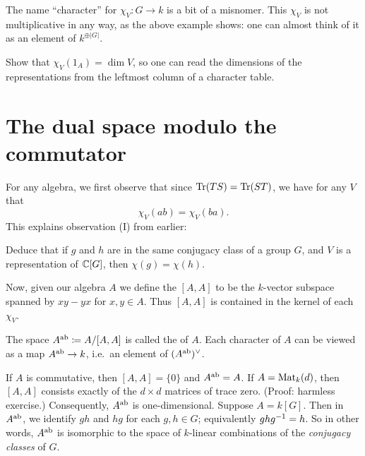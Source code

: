 \begin{abuse}
	The name ``character'' for $\chi_V \colon G \to k$ is a bit of a misnomer.
	This $\chi_V$ is not multiplicative in any way,
	as the above example shows: one can almost think of it as
	an element of $k^{\oplus |G|}$.
\end{abuse}

\begin{ques}
	Show that $\chi_V(1_A) = \dim V$,
	so one can read the dimensions of the representations
	from the leftmost column of a character table.
\end{ques}

\section{The dual space modulo the commutator}
For any algebra, we first observe that since $\operatorname{Tr}(TS) = \operatorname{Tr}(ST)$,
we have for any $V$ that
\[ \chi_V(ab) = \chi_V(ba). \]
This explains observation (I) from earlier:
\begin{ques}
	Deduce that if $g$ and $h$ are in the same conjugacy class of a
	group $G$, and $V$ is a representation of $\mathbb C[G]$,
	then $\chi(g) = \chi(h)$.
\end{ques}
Now, given our algebra $A$ we define the  $[A,A]$
to be the $k$-vector subspace spanned by $xy-yx$ for $x,y \in A$.
Thus $[A,A]$ is contained in the kernel of each $\chi_V$.
\begin{definition}
	The space $A^\text{ab} \coloneqq A / [A,A]$ is called the  of $A$.
	Each character of $A$ can be viewed as a map $A^\text{ab} \to k$, i.e.\ an element of $(A^\text{ab})^\vee$.
\end{definition}
\begin{example}
	\listhack
	\begin{enumerate}[(a)]
		\ii If $A$ is commutative, then $[A,A] = \{0\}$
		and $A^\text{ab} = A$.
		\ii If $A = \mathrm{Mat}_k(d)$, then $[A,A]$ consists exactly
		of the $d \times d$ matrices of trace zero.
		(Proof: harmless exercise.)
		Consequently, $A^\text{ab}$ is one-dimensional.
		\ii Suppose $A = k[G]$.
		Then in $A^\text{ab}$, we identify $gh$ and $hg$ for each $g,h \in G$;
		equivalently $ghg^{-1} = h$.
		So in other words, $A^\text{ab}$ is isomorphic to the space of
		$k$-linear combinations of the \emph{conjugacy classes} of $G$.
	\end{enumerate}
\end{example}

